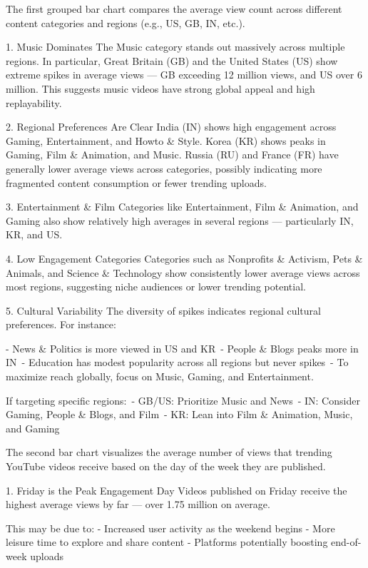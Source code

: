 \documentclass[a4paper]{article}
\begin{document}
\begin{multicols}{2} 


The first grouped bar chart compares the average view count across different content categories and regions (e.g., US, GB, IN, etc.).

1. Music Dominates
The Music category stands out massively across multiple regions.
In particular, Great Britain (GB) and the United States (US) show extreme spikes in average views — GB exceeding 12 million views, and US over 6 million.
This suggests music videos have strong global appeal and high replayability.

2. Regional Preferences Are Clear
India (IN) shows high engagement across Gaming, Entertainment, and Howto \& Style.
Korea (KR) shows peaks in Gaming, Film \& Animation, and Music.
Russia (RU) and France (FR) have generally lower average views across categories, possibly indicating more fragmented content consumption or fewer trending uploads.

3. Entertainment \& Film
Categories like Entertainment, Film \& Animation, and Gaming also show relatively high averages in several regions — particularly IN, KR, and US.

4. Low Engagement Categories
Categories such as Nonprofits \& Activism, Pets \& Animals, and Science \& Technology show consistently lower average views across most regions, suggesting niche audiences or lower trending potential.

5. Cultural Variability
The diversity of spikes indicates regional cultural preferences. For instance:

- News \& Politics is more viewed in US and KR\
- People \& Blogs peaks more in IN\
- Education has modest popularity across all regions but never spikes\
- To maximize reach globally, focus on Music, Gaming, and Entertainment.

If targeting specific regions:\
- GB/US: Prioritize Music and News\
- IN: Consider Gaming, People \& Blogs, and Film\
- KR: Lean into Film \& Animation, Music, and Gaming





The second bar chart visualizes the average number of views that trending YouTube videos receive based on the day of the week they are published.

1. Friday is the Peak Engagement Day
Videos published on Friday receive the highest average views by far — over 1.75 million on average.

This may be due to:
- Increased user activity as the weekend begins
- More leisure time to explore and share content
- Platforms potentially boosting end-of-week uploads


\end{multicols}
\end{document}
